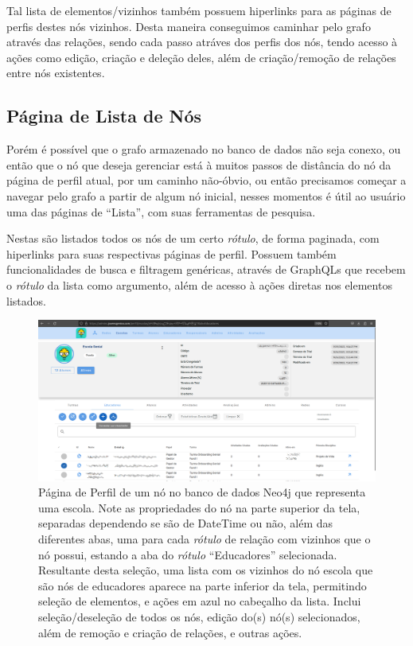 \documentclass[12pt]{article}
\begin{document}
Tal lista de elementos/vizinhos também possuem hiperlinks para as páginas de perfis destes nós vizinhos. Desta maneira conseguimos caminhar pelo grafo através das relações, sendo cada passo atráves dos perfis dos nós, tendo acesso à ações como edição, criação e deleção deles, além de criação/remoção de relações entre nós existentes.

\subsection{Página de Lista de Nós}

Porém é possível que o grafo armazenado no banco de dados não seja conexo, ou então que o nó que deseja gerenciar está à muitos passos de distância do nó da página de perfil atual, por um caminho não-óbvio, ou então precisamos começar a navegar pelo grafo a partir de algum nó inicial, nesses momentos é útil ao usuário uma das páginas de ``Lista'', com suas ferramentas de pesquisa.

Nestas são listados todos os nós de um certo \textit{rótulo}, de forma paginada, com hiperlinks para suas respectivas páginas de perfil. Possuem também funcionalidades de busca e filtragem genéricas, através de GraphQLs que recebem o \textit{rótulo} da lista como argumento, além de acesso à ações diretas nos elementos listados.

\begin{figure}[ht]
\centering
\includegraphics[width=1\textwidth]{profile-example.png}
\caption{Página de Perfil de um nó no banco de dados Neo4j que representa uma escola. Note as propriedades do nó na parte superior da tela, separadas dependendo se são de DateTime ou não, além das diferentes abas, uma para cada \textit{rótulo} de relação com vizinhos que o nó possui, estando a aba do \textit{rótulo} ``Educadores'' selecionada. Resultante desta seleção, uma lista com os vizinhos do nó escola que são nós de educadores aparece na parte inferior da tela, permitindo seleção de elementos, e ações em azul no cabeçalho da lista. Inclui seleção/deseleção de todos os nós, edição do(s) nó(s) selecionados, além de remoção e criação de relações, e outras ações.}
\label{fig:profile-example}
\end{figure}
\end{document}
